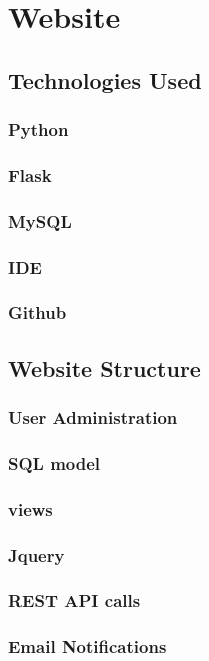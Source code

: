 \chapter{Website}

\section{Technologies Used}
\subsection{Python}
\subsection{Flask}
\subsection{MySQL}
\subsection{IDE}
\subsection{Github}

\section{Website Structure}
\subsection{User Administration}
\subsection{SQL model}
\subsection{views}
\subsection{Jquery}
\subsection{REST API calls}
\subsection{Email Notifications}
